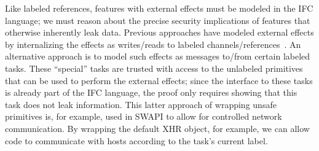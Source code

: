 Like labeled references, features with external effects must be
modeled in the IFC language; we must reason about the precise security
implications of features that otherwise inherently leak data.
%
Previous approaches have modeled external effects by internalizing the
effects as writes/reads to labeled channels/references~\cite{stefan:addressing-covert}.
%
An alternative approach is to model such effects as messages to/from
certain labeled tasks.
%
These ``special'' tasks are trusted with access to the unlabeled
primitives that can be used to perform the external effects; since the
interface to these tasks is already part of the IFC language, the
proof only requires showing that this task does not leak information.
%
This latter approach of wrapping unsafe primitives is, for example,
used in SWAPI to allow for controlled network communication.
%
By wrapping the default XHR object, for example, we can allow code
to communicate with hosts according to the task's current label.

